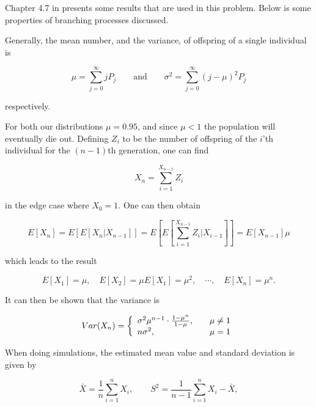 Chapter 4.7 in \cite{ross} presents some results that are used in this problem. Below is some properties of branching processes discussed.

Generally, the mean number, and the variance, of offspring of a single individual is

\begin{equation}
\label{meanvar}
\mu = \sum_{j=0}^{\infty} jP_j \quad \quad \text{and} \quad \quad \sigma^2 = \sum_{j=0}^{\infty} (j-\mu)^2P_j
\end{equation}

respectively.

For both our distributions $\mu = 0.95$, and since $\mu < 1$ the population will eventually die out. Defining $Z_i$ to be the number of offspring of the $i$'th individual for the $(n-1)$th generation, one can find 

\begin{equation}
X_n = \sum_{i=1}^{X_{n-1}} Z_i
\end{equation}

in the edge case where $X_0=1$. One can then obtain

\begin{equation}
E[X_n] = E[E[X_n | X_{n-1}]] = E\left[ E\left[ \sum_{i=1}^{X_{n-1}} Z_i | X_{i-1} \right] \right] = E[X_{n-1}] \mu 
\end{equation}

which leads to the result

\begin{equation}
\label{mean}
E[X_1] = \mu, \quad E[X_2] = \mu E[X_1] = \mu^2, \quad \cdots, \quad E[X_n] = \mu^n.
\end{equation}

It can then be shown that the variance is

\begin{align}
\label{variance}
  Var(X_n) = \left\{ 
  \begin{array}{l l l}
     \sigma^2 \mu^{n-1} \cdot \frac{1-\mu^n}{1-\mu}, \quad &\mu \neq 1\\
     n \sigma^2, \quad  &\mu = 1 \\
  \end{array} \right.
\end{align}

When doing simulations, the estimated mean value and standard deviation is given by

\begin{equation}
\bar{X} = \frac{1}{n} \sum_{i=1}^{n} X_i, \qquad S^2 = \frac{1}{n-1}\sum_{i=1}^{n} X_i - \bar{X},
\end{equation}

